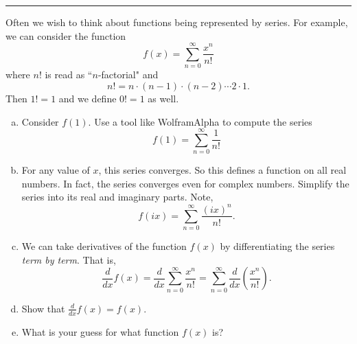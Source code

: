 \documentclass[12pt]{article} %
\begin{document}
\hrule
\begin{problem}
Often we wish to think about functions being represented by series.  For example, we can consider the function
\[
f(x)=\sum_{n=0}^\infty \frac{x^n}{n!}
\]
where $n!$ is read as ``$n$-factorial" and 
\[
n! = n\cdot (n-1)\cdot (n-2) \cdots 2 \cdot 1.
\]
Then $1!=1$ and we define $0!=1$ as well.
\begin{enumerate}[(a)]
    \item Consider $f(1)$.  Use a tool like WolframAlpha to compute the series
    \[
    f(1)=\sum_{n=0}^\infty \frac{1}{n!}
    \]
    \item For any value of $x$, this series converges. So this defines a function on all real numbers. In fact, the series converges even for complex numbers. Simplify the series into its real and imaginary parts. Note,
    \[
    f(ix) = \sum_{n=0}^\infty \frac{(ix)^n}{n!}.
    \]
    \item We can take derivatives of the function $f(x)$ by differentiating the series \emph{term by term}. That is,
    \[
    \frac{d}{dx} f(x) = \frac{d}{dx} \sum_{n=0}^\infty \frac{x^n}{n!} = \sum_{n=0}^\infty \frac{d}{dx} \left( \frac{ x^n}{n!}\right).
    \]
    \item Show that $\frac{d}{dx}f(x)=f(x)$.
    \item What is your guess for what function $f(x)$ is?
\end{enumerate}
\end{problem}
\end{document}

